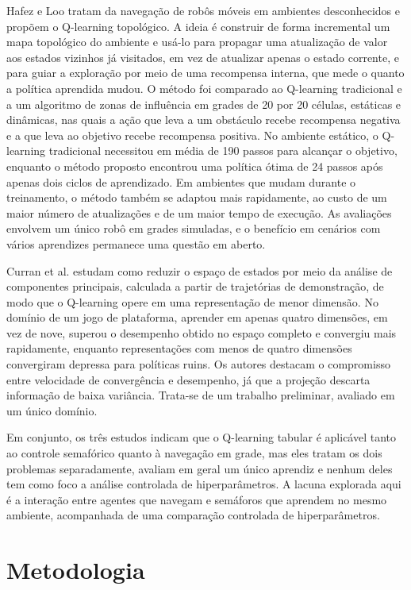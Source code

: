 \documentclass[12pt]{article}
\begin{document}
Hafez e Loo \cite{Hafez2015} tratam da navegação de robôs móveis em ambientes desconhecidos e propõem o Q-learning
topológico. A ideia é construir de forma incremental um mapa topológico do ambiente e usá-lo para propagar uma atualização
de valor aos estados vizinhos já visitados, em vez de atualizar apenas o estado corrente, e para guiar a exploração por
meio de uma recompensa interna, que mede o quanto a política aprendida mudou. O método foi comparado ao Q-learning
tradicional e a um algoritmo de zonas de influência em grades de 20 por 20 células, estáticas e dinâmicas, nas quais a ação
que leva a um obstáculo recebe recompensa negativa e a que leva ao objetivo recebe recompensa positiva. No ambiente
estático, o Q-learning tradicional necessitou em média de 190 passos para alcançar o objetivo, enquanto o método proposto
encontrou uma política ótima de 24 passos após apenas dois ciclos de aprendizado. Em ambientes que mudam durante o
treinamento, o método também se adaptou mais rapidamente, ao custo de um maior número de atualizações e de um maior tempo
de execução. As avaliações envolvem um único robô em grades simuladas, e o benefício em cenários com vários aprendizes
permanece uma questão em aberto.

Curran et al. \cite{Curran2015} estudam como reduzir o espaço de estados por meio da análise de componentes principais,
calculada a partir de trajetórias de demonstração, de modo que o Q-learning opere em uma representação de menor dimensão.
No domínio de um jogo de plataforma, aprender em apenas quatro dimensões, em vez de nove, superou o desempenho obtido no
espaço completo e convergiu mais rapidamente, enquanto representações com menos de quatro dimensões convergiram depressa
para políticas ruins. Os autores destacam o compromisso entre velocidade de convergência e desempenho, já que a projeção
descarta informação de baixa variância. Trata-se de um trabalho preliminar, avaliado em um único domínio.

Em conjunto, os três estudos indicam que o Q-learning tabular é aplicável tanto ao controle semafórico quanto à navegação
em grade, mas eles tratam os dois problemas separadamente, avaliam em geral um único aprendiz e nenhum deles tem como foco
a análise controlada de hiperparâmetros. A lacuna explorada aqui é a interação entre agentes que navegam e semáforos que
aprendem no mesmo ambiente, acompanhada de uma comparação controlada de hiperparâmetros.

\section{Metodologia}\label{sec:metodologia}
\end{document}

